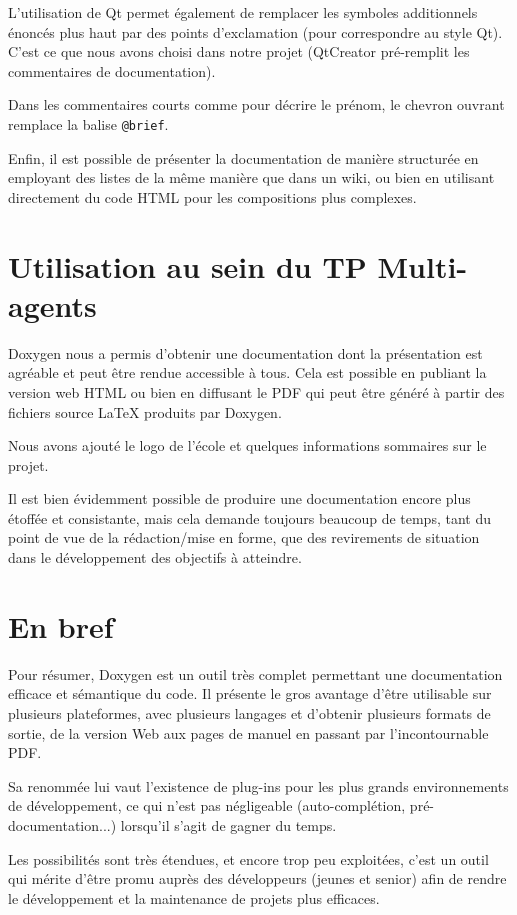     L'utilisation de Qt permet également de remplacer les symboles additionnels énoncés plus haut par des points d'exclamation (pour correspondre au style Qt). C'est ce que nous avons choisi dans notre projet (QtCreator pré-remplit les commentaires de documentation).

    Dans les commentaires courts comme pour décrire le prénom, le chevron ouvrant remplace la balise \texttt{@brief}.

    Enfin, il est possible de présenter la documentation de manière structurée en employant des listes de la même manière que dans un wiki, ou bien en utilisant directement du code HTML pour les compositions plus complexes.

\section{Utilisation au sein du TP Multi-agents}
  Doxygen nous a permis d'obtenir une documentation dont la présentation est agréable et peut être rendue accessible à tous. Cela est possible en publiant la version web HTML ou bien en diffusant le PDF qui peut être généré à partir des fichiers source \LaTeX{} produits par Doxygen.

  Nous avons ajouté le logo de l'école et quelques informations sommaires sur le projet.

  Il est bien évidemment possible de produire une documentation encore plus étoffée et consistante, mais cela demande toujours beaucoup de temps, tant du point de vue de la rédaction/mise en forme, que des revirements de situation dans le développement des objectifs à atteindre.

\section{En bref}
  Pour résumer, Doxygen est un outil très complet permettant une documentation efficace et sémantique du code. Il présente le gros avantage d'être utilisable sur plusieurs plateformes, avec plusieurs langages et d'obtenir plusieurs formats de sortie, de la version Web aux pages de manuel en passant par l'incontournable PDF. 

  Sa renommée lui vaut l'existence de plug-ins pour les plus grands environnements de développement, ce qui n'est pas négligeable (auto-complétion, pré-documentation...) lorsqu'il s'agit de gagner du temps.

  Les possibilités sont très étendues, et encore trop peu exploitées, c'est un outil qui mérite d'être promu auprès des développeurs (jeunes et senior) afin de rendre le développement et la maintenance de projets plus efficaces.

